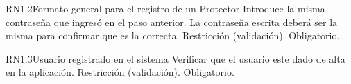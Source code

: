 \begin{BussinesRule}{RN1.2}{Formato general para el registro de un Protector}
	 Introduce la misma contraseña que ingresó en el paso anterior.
	\BRitem[Descripción:] La contraseña escrita deberá ser la misma para confirmar que es la correcta.
	\BRitem[Tipo:] Restricción (validación).
	\BRitem[Nivel:] Obligatorio.
\end{BussinesRule}

\begin{BussinesRule}{RN1.3}{Usuario registrado en el sistema}
	\BRitem[Descripción:] Verificar que el usuario este dado de alta en la aplicación.
	\BRitem[Tipo:] Restricción (validación).
	\BRitem[Nivel:] Obligatorio.
\end{BussinesRule}
